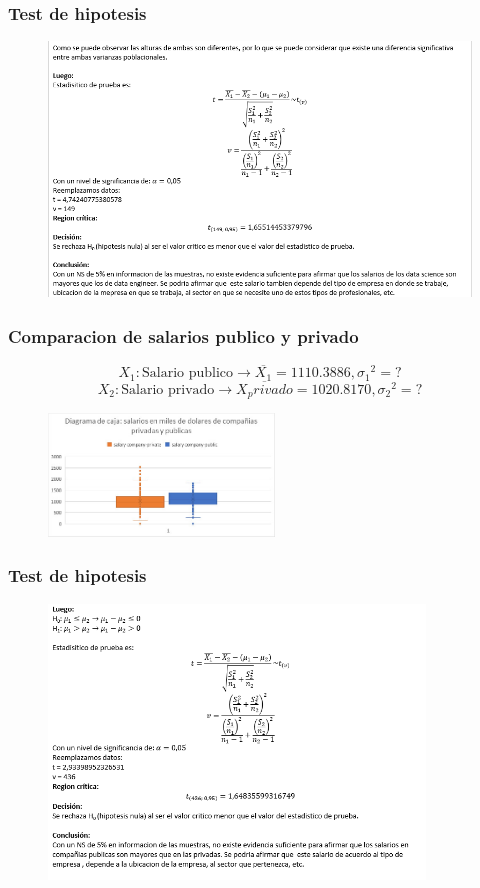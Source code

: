 \documentclass{beamer}
\begin{document}
\begin{frame}
  \frametitle{Test de hipotesis}
\begin{figure}[t]
    \includegraphics[width=12cm]{Screenshot_20221028_234650.png}
\end{figure}
\end{frame}

\begin{frame}
  \frametitle{Comparacion de salarios publico y privado}
  \[{X_1}: \textrm{Salario publico} \rightarrow \overline{X_1} = 1110.3886, {\sigma_1}^2 = ?\]
  \[{X_2}: \textrm{Salario privado} \rightarrow \overline{X_privado} = 1020.8170, {\sigma_2}^2 = ?\]
\begin{figure}[t]
  \includegraphics[width=6cm]{cajas2.jpeg}
\end{figure}
\end{frame}

\begin{frame}
  \frametitle{Test de hipotesis}
\begin{figure}[t]
    \includegraphics[width=10cm]{Screenshot_20221028_235052.png}
\end{figure}
\end{frame}
\end{document}
